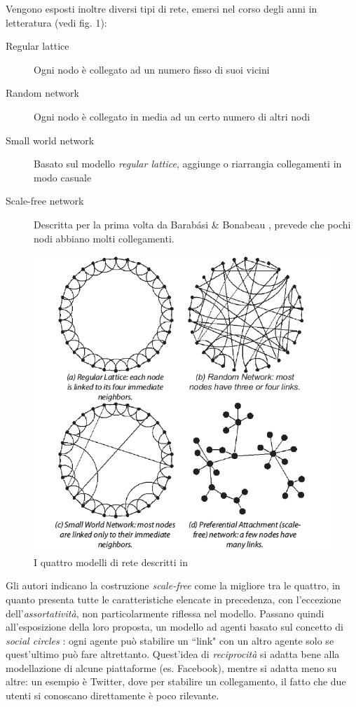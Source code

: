 \documentclass[a4paper,12pt]{article}
\begin{document}
Vengono esposti inoltre diversi tipi di rete, emersi nel corso degli anni in letteratura (vedi fig. 1):
\begin{description}
\item[Regular lattice] Ogni nodo è collegato ad un numero fisso di suoi vicini
\item[Random network] Ogni nodo è collegato in media ad un certo numero di altri nodi
\item[Small world network] Basato sul modello \textit{regular lattice}, aggiunge o riarrangia collegamenti in modo casuale
\item[Scale-free network] Descritta per la prima volta da Barabási \& Bonabeau \cite{scalefree}, prevede che pochi nodi abbiano molti collegamenti.
\end{description}
\begin{figure}[h]
\centering
\includegraphics[scale=0.9]{images/Hamill_Gilbert11.png}
\caption{I quattro modelli di rete descritti in \cite{gilbert}}
\end{figure}
Gli autori indicano la costruzione \textit{scale-free} come la migliore tra le quattro, in quanto presenta tutte le caratteristiche elencate in precedenza, con l'eccezione dell'\textit{assortatività}, non particolarmente riflessa nel modello. Passano quindi all'esposizione della loro proposta, un modello ad agenti basato sul concetto di \textit{social circles} \cite{gilbert}: ogni agente può stabilire un ``link" con un altro agente solo se quest'ultimo può fare altrettanto. Quest'idea di \textit{reciprocità} si adatta bene alla modellazione di alcune piattaforme (es. Facebook), mentre si adatta meno su altre: un esempio è Twitter, dove per stabilire un collegamento, il fatto che due utenti si conoscano direttamente è poco rilevante. \\ \\
\end{document}
